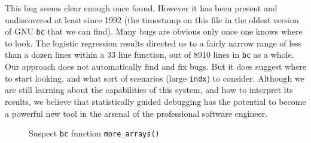 This bug seems clear enough once found.  However it has been present
and undiscovered at least since 1992 (the timestamp on this file in
the oldest version of GNU \texttt{bc} that we can find).  Many bugs
are obvious only once one knows where to look.  The logistic
regression results directed us to a fairly narrow range of less than a
dozen lines within a 33 line function, out of 8910 lines in
\texttt{bc} as a whole.  Our approach does not automatically find and
fix bugs.  But it does suggest where to start looking, and what sort
of scenarios (large \texttt{indx}) to consider.  Although we are still
learning about the capabilities of this system, and how to interpret
its results, we believe that statistically guided debugging has the
potential to become a powerful new tool in the arsenal of the
professional software engineer.

\begin{figure}
  \centering
  \small
  \caption{Suspect \texttt{bc} function \texttt{more\_arrays()}}
  \label{fig:bc:more-arrays}
\end{figure}
